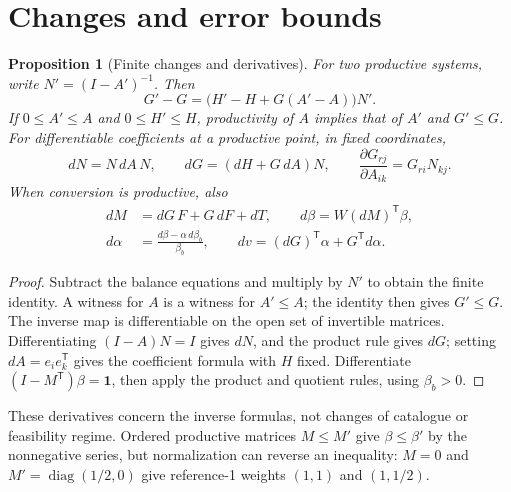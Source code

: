 \documentclass[11pt,a4paper]{article}
\newtheorem{proposition}[theorem]{Proposition}
\begin{document}
\section{Changes and error bounds}
\begin{proposition}[Finite changes and derivatives]
For two productive systems, write $N'=(I-A')^{-1}$. Then
\begin{equation}
G'-G=\bigl(H'-H+G(A'-A)\bigr)N'.
\end{equation}
If $0\leq A'\leq A$ and $0\leq H'\leq H$, productivity of $A$ implies that of $A'$ and $G'\leq G$. For differentiable coefficients at a productive point, in fixed coordinates,
\begin{equation}
dN=N\,dA\,N,\qquad dG=(dH+G\,dA)N,\qquad
\frac{\partial G_{rj}}{\partial A_{ik}}=G_{ri}N_{kj}.
\end{equation}
When conversion is productive, also
\begin{equation}
\begin{aligned}
dM&=dG\,F+G\,dF+dT,\qquad d\beta=W(dM)^{\mathsf T}\beta,\\
d\alpha&=\frac{d\beta-\alpha\,d\beta_b}{\beta_b},\qquad dv=(dG)^{\mathsf T}\alpha+G^{\mathsf T}d\alpha.
\end{aligned}
\end{equation}
\end{proposition}
\begin{proof}
Subtract the balance equations and multiply by $N'$ to obtain the finite identity. A witness for $A$ is a witness for $A'\leq A$; the identity then gives $G'\leq G$. The inverse map is differentiable on the open set of invertible matrices. Differentiating $(I-A)N=I$ gives $dN$, and the product rule gives $dG$; setting $dA=e_i e_k^{\mathsf T}$ gives the coefficient formula with $H$ fixed. Differentiate $(I-M^{\mathsf T})\beta=\mathbf1$, then apply the product and quotient rules, using $\beta_b>0$.
\end{proof}

These derivatives concern the inverse formulas, not changes of catalogue or feasibility regime. Ordered productive matrices $M\leq M'$ give $\beta\leq\beta'$ by the nonnegative series, but normalization can reverse an inequality: $M=0$ and $M'=\operatorname{diag}(1/2,0)$ give reference-1 weights $(1,1)$ and $(1,1/2)$.
\end{document}

